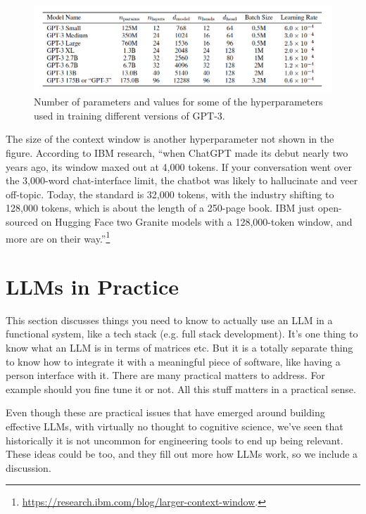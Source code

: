 \begin{figure}[h]
\centering
\includegraphics[scale=.4]{./images/gpt3_params.png}
\caption[\url{https://arxiv.org/abs/2005.14165}.]{Number of parameters and values for some of the hyperparameters used in training different versions of GPT-3. }
\label{gptParams}
\end{figure}

The size of the context window is another hyperparameter not shown in the figure. According to IBM research, ``when ChatGPT made its debut nearly two years ago, its window maxed out at 4,000 tokens. If your conversation went over the 3,000-word chat-interface limit, the chatbot was likely to hallucinate and veer off-topic. Today, the standard is 32,000 tokens, with the industry shifting to 128,000 tokens, which is about the length of a 250-page book. IBM just open-sourced on Hugging Face two Granite models with a 128,000-token window, and more are on their way.''\footnote{\url{https://research.ibm.com/blog/larger-context-window}.}

\section{LLMs in Practice}

This section discusses things you need to know to actually use an LLM in a functional system, like a tech stack (e.g. full stack development). It's one thing to know what an LLM is in terms of matrices etc.  But it is a totally separate thing to know how to integrate it with a meaningful piece of software, like having a person interface with it.  There are many practical matters to address.  For example should you fine tune it or not. All this stuff matters in a practical sense. 

Even though these are practical issues that have emerged around building effective LLMs, with virtually no thought to cognitive science, we've seen that historically it is not uncommon for engineering tools to end up being relevant. These ideas could be too, and they fill out more how LLMs work, so we include a discussion.  

